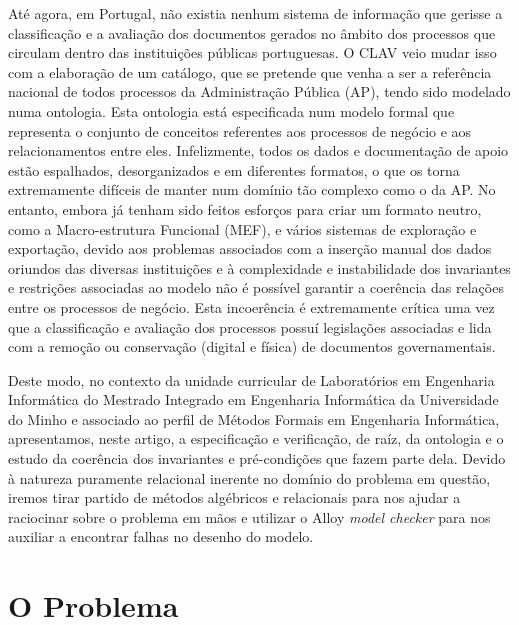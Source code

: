 \documentclass[tikz,runningheads,a4paper]{llncs}
\begin{document}
Até agora, em Portugal, não existia nenhum sistema de informação que gerisse a classificação e a avaliação dos documentos gerados no âmbito dos processos que circulam dentro das instituições públicas portuguesas. O CLAV veio mudar isso com a elaboração de um catálogo, que se pretende que venha a ser a referência nacional de todos processos da Administração Pública (AP), tendo sido modelado numa ontologia. Esta ontologia está especificada num modelo formal que representa o conjunto de conceitos referentes aos processos de negócio e aos relacionamentos entre eles. Infelizmente, todos os dados e documentação de apoio estão espalhados, desorganizados e em diferentes formatos, o que os torna extremamente difíceis de manter num domínio tão complexo como o da AP. No entanto, embora já tenham sido feitos esforços para criar um formato neutro, como a Macro-estrutura Funcional (MEF), e vários sistemas de exploração e exportação, devido aos problemas associados com a inserção manual dos dados oriundos das diversas instituições e à complexidade e instabilidade dos invariantes e restrições associadas ao modelo não é possível garantir a coerência das relações entre os processos de negócio. Esta incoerência é extremamente crítica uma vez que a classificação e avaliação dos processos possuí legislações associadas e lida com a remoção ou conservação (digital e física) de documentos governamentais\cite{clav-new}.

Deste modo, no contexto da unidade curricular de Laboratórios em Engenharia Informática do Mestrado Integrado em Engenharia Informática da Universidade do Minho e associado ao perfil de Métodos Formais em Engenharia Informática, apresentamos, neste artigo, a especificação e verificação, de raíz, da ontologia e o estudo da coerência dos invariantes e pré-condições que fazem parte dela. Devido à natureza puramente relacional inerente no domínio do problema em questão, iremos tirar partido de métodos algébricos e relacionais para nos ajudar a raciocinar sobre o problema em mãos e utilizar o Alloy \textit{model checker} para nos auxiliar a encontrar falhas no desenho do modelo.

\section{O Problema}
\end{document}
